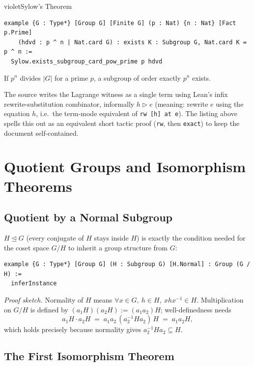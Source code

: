 \documentclass[11pt]{article}
\begin{document}
\begin{defbox}{violet}{Sylow's Theorem}
\begin{lstlisting}
example {G : Type*} [Group G] [Finite G] (p : Nat) {n : Nat} [Fact p.Prime]
    (hdvd : p ^ n | Nat.card G) : exists K : Subgroup G, Nat.card K = p ^ n :=
  Sylow.exists_subgroup_card_pow_prime p hdvd
\end{lstlisting}
If $p^n$ divides $|G|$ for a prime $p$, a subgroup of order exactly $p^n$ exists.
\end{defbox}

\begin{auditnote}
The source writes the Lagrange witness as a single term using Lean's infix rewrite-substitution combinator, informally $h \triangleright e$ (meaning: rewrite $e$ using the equation $h$, i.e.\ the term-mode equivalent of \verb|rw [h] at e|). The listing above spells this out as an equivalent short tactic proof (\verb|rw|, then \verb|exact|) to keep the document self-contained.
\end{auditnote}

\section{Quotient Groups and Isomorphism Theorems}

\subsection{Quotient by a Normal Subgroup}

$H\trianglelefteq G$ (every conjugate of $H$ stays inside $H$) is exactly the condition needed for the coset space $G/H$ to inherit a group structure from $G$:

\begin{lstlisting}
example {G : Type*} [Group G] (H : Subgroup G) [H.Normal] : Group (G / H) :=
  inferInstance
\end{lstlisting}

\emph{Proof sketch.} Normality of $H$ means $\forall x\in G,\ h\in H,\ xhx^{-1}\in H$. Multiplication on $G/H$ is defined by $(a_1H)(a_2H) := (a_1a_2)H$; well-definedness needs
\[
a_1H\cdot a_2H \;=\; a_1a_2\,(a_2^{-1}Ha_2)\,H \;=\; a_1a_2H,
\]
which holds precisely because normality gives $a_2^{-1}Ha_2\subseteq H$.

\subsection{The First Isomorphism Theorem}
\end{document}

